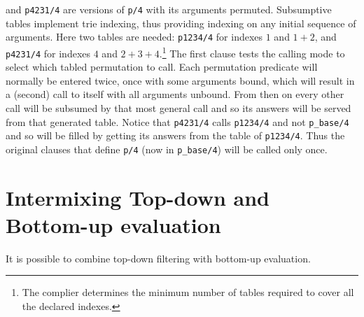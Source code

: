  and {\tt p4231/4} are versions of {\tt p/4}
with its arguments permuted.  Subsumptive tables implement trie
indexing, thus providing indexing on any initial sequence of
arguments.  Here two tables are needed: {\tt p1234/4} for indexes $1$
and $1+2$, and {\tt p4231/4} for indexes $4$ and $2+3+4$.\footnote{The
  complier determines the minimum number of tables required to cover
  all the declared indexes.}  The first clause tests the calling mode
to select which tabled permutation to call.  Each permutation
predicate will normally be entered twice, once with some arguments
bound, which will result in a (second) call to itself with all
arguments unbound.  From then on every other call will be subsumed by
that most general call and so its answers will be served from that
generated table.  Notice that {\tt p4231/4} calls {\tt p1234/4} and
not {\tt p\_base/4} and so will be filled by getting its answers from
the table of {\tt p1234/4}.  Thus the original clauses that define
{\tt p/4} (now in {\tt p\_base/4}) will be called only once.

\section{Intermixing Top-down and Bottom-up evaluation}

It is possible to combine top-down filtering with bottom-up
evaluation.

